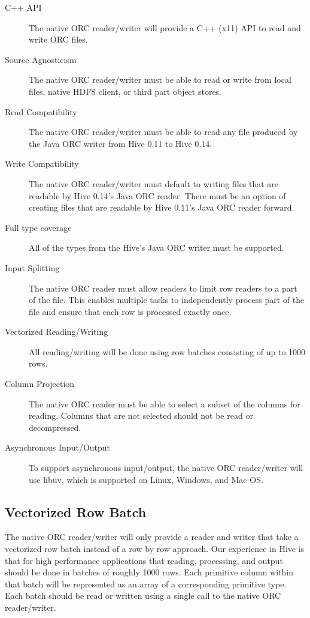 \documentclass{article}
\begin{document}
\begin{description}
\item [C++ API] The native ORC reader/writer will provide a C++ (x11) API
  to read and write ORC files.
\item [Source Agnosticism] The native ORC reader/writer must be able to
  read or write from local files, native HDFS client, or third part 
  object stores.
\item [Read Compatibility] The native ORC reader/writer must be able
  to read any file produced by the Java ORC writer from Hive 0.11 to
  Hive 0.14.
\item [Write Compatibility] The native ORC reader/writer must default
  to writing files that are readable by Hive 0.14's Java ORC reader.
  There must be an option of creating files that are readable by Hive
  0.11's Java ORC reader forward.
\item [Full type coverage] All of the types from the Hive's Java ORC
  writer must be supported.
\item [Input Splitting] The native ORC reader must allow readers to
  limit row readers to a part of the file. This enables multiple tasks
  to independently process part of the file and ensure that each row
  is processed exactly once.
\item [Vectorized Reading/Writing] All reading/writing will be done
  using row batches consisting of up to 1000 rows.
\item [Column Projection] The native ORC reader must be able to select
  a subset of the columns for reading. Columns that are not selected should
  not be read or decompressed.
\item [Asynchronous Input/Output] To support asynchronous input/output, the
  native ORC reader/writer will use libuv, which is supported on Linux,
  Windows, and Mac OS.
\end{description}

\subsection{Vectorized Row Batch}

The native ORC reader/writer will only provide a reader and writer
that take a vectorized row batch instead of a row by row approach. Our
experience in Hive is that for high performance applications that
reading, processing, and output should be done in batches of roughly
1000 rows. Each primitive column within that batch will be represented
as an array of a corresponding primitive type. Each batch should be
read or written using a single call to the native ORC reader/writer.
\end{document}
